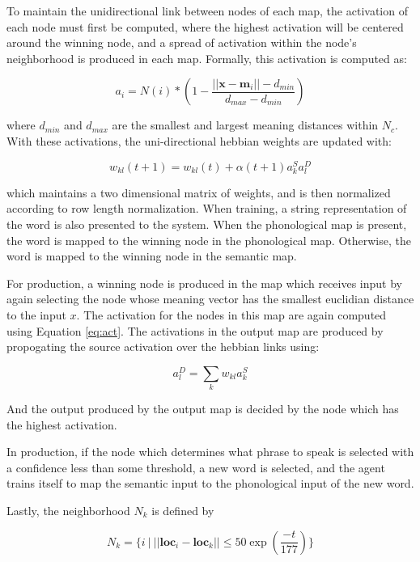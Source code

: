 \documentclass[a4paper,11pt]{article}
\begin{document}
To maintain the unidirectional link between nodes of each map, the activation of
each node must first be computed, where the highest activation will be centered
around the winning node, and a spread of activation within the node's
neighborhood is produced in each map.  Formally, this activation is computed as:

\begin{equation}\label{eq:act}
a_i = N(i)*(1 - \frac{||\textbf{x} - \textbf{m$_i$}|| - d_{min} }{d_{max} -
d_{min}})
\end{equation}

where $d_{min}$ and $d_{max}$ are the smallest and largest meaning distances
within $N_c$.  With these activations, the uni-directional hebbian weights are
updated with:

\begin{equation}\label{eq:heb_weight}
w_{kl}(t+1) = w_{kl}(t) + \alpha(t+1)a_k^Sa_l^D
\end{equation}

which maintains a two dimensional matrix of weights, and is then normalized
according to row length normalization.  When training, a string representation
of the word is also presented to the system.  When the phonological map 
is present, the word is mapped to the winning node in the phonological map.
Otherwise, the word is mapped to the winning node in the semantic map.

For production, a winning node is produced in the map which receives input by
again selecting the node whose meaning vector has the smallest euclidian
distance to the input $x$.  The activation for the nodes in this map are again
computed using Equation \ref{eq:act}.  The activations in the output map are
produced by propogating the source activation over the hebbian links using:

\begin{equation}\label{eq:prop}
a_l^D = \sum_k w_{kl}a_k^S
\end{equation}

And the output produced by the output map is decided by the node which has the
highest activation.

In production, if the node which determines what phrase to speak is selected with a
confidence less than some threshold, a new word is selected, and the agent
trains itself to map the semantic input to the phonological input of the new
word.

Lastly, the neighborhood $N_k$ is defined by

\begin{equation}\label{eq:neighbors}
N_k = \{ i \:| \:|| \textbf{loc$_i$} - \textbf{loc$_k$} || \leq 50\exp(\frac
{-t}{177})\}
\end{equation}
\end{document}
